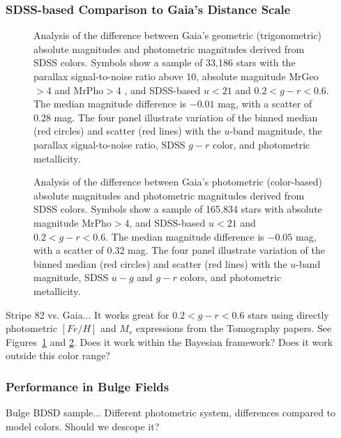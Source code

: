 
\subsubsection{SDSS-based Comparison to Gaia's Distance Scale} 


\begin{figure}[ht!]
\caption{Analysis of the difference between Gaia's geometric (trigonometric) absolute magnitudes and photometric magnitudes
  derived from SDSS colors. Symbols show a sample of 33,186 stars with the parallax signal-to-noise ratio above 10, absolute
  magnitude MrGeo$>$4 and MrPho$>$4 , and SDSS-based $u<21$ and $0.2 < g-r < 0.6$. The median magnitude difference is
  $-0.01$ mag, with a scatter of 0.28 mag. The four panel illustrate variation of the binned median (red circles) and scatter (red
  lines) with the $u$-band magnitude, the parallax signal-to-noise ratio, SDSS $g-r$ color, and photometric metallicity.} 
\label{fig:gaiasdss1}
\end{figure}


\begin{figure}[ht!]
\caption{Analysis of the difference between Gaia's photometric (color-based) absolute magnitudes and photometric magnitudes
  derived from SDSS colors. Symbols show a sample of 165,834 stars with absolute magnitude MrPho$>$4, and SDSS-based $u<21$
  and $0.2 < g-r < 0.6$. The median magnitude difference is $-0.05$ mag, with a scatter of 0.32 mag. The four panel illustrate
  variation of the binned median (red circles) and scatter (red lines) with the $u$-band magnitude, SDSS $u-g$ and $g-r$ colors,
  and photometric metallicity.}
\label{fig:gaiasdss2}
\end{figure}



Stripe 82 vs. Gaia...  It works great for $0.2 < g-r < 0.6$ stars using directly photometric $[Fe/H]$ and $M_r$ expressions from the
Tomography papers. See Figures~\ref{fig:gaiasdss1} and \ref{fig:gaiasdss2}. Does it work within the Bayesian framework? Does it work outside this color range? 




\subsubsection{Performance in Bulge Fields} 

Bulge BDSD sample...  Different photometric system, differences compared to model colors. Should we descope it? 

